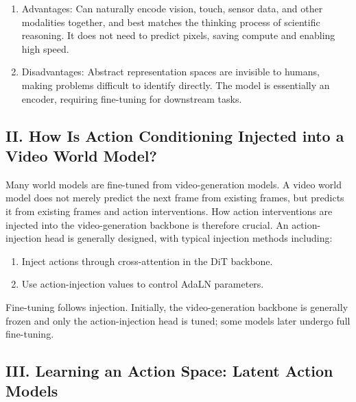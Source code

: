 \begin{enumerate}
\def\labelenumi{\arabic{enumi}.}
\item
  Advantages: Can naturally encode vision, touch, sensor data, and other modalities together, and best matches the thinking process of scientific reasoning. It does not need to predict pixels, saving compute and enabling high speed.
\item
  Disadvantages: Abstract representation spaces are invisible to humans, making problems difficult to identify directly. The model is essentially an encoder, requiring fine-tuning for downstream tasks.
\end{enumerate}

\hypertarget{ii.-how-is-action-conditioning-injected-into-a-video-world-model}{%
\subsection{II. How Is Action Conditioning Injected into a Video World Model?}\label{ii.-how-is-action-conditioning-injected-into-a-video-world-model}}

Many world models are fine-tuned from video-generation models. A video world model does not merely predict the next frame from existing frames, but predicts it from existing frames and action interventions. How action interventions are injected into the video-generation backbone is therefore crucial. An action-injection head is generally designed, with typical injection methods including:

\begin{enumerate}
\def\labelenumi{\arabic{enumi}.}
\item
  Inject actions through cross-attention in the DiT backbone.
\item
  Use action-injection values to control AdaLN parameters.
\end{enumerate}

Fine-tuning follows injection. Initially, the video-generation backbone is generally frozen and only the action-injection head is tuned; some models later undergo full fine-tuning.

\hypertarget{iii.-learning-an-action-space-latent-action-models}{%
\subsection{III. Learning an Action Space: Latent Action Models}\label{iii.-learning-an-action-space-latent-action-models}}

